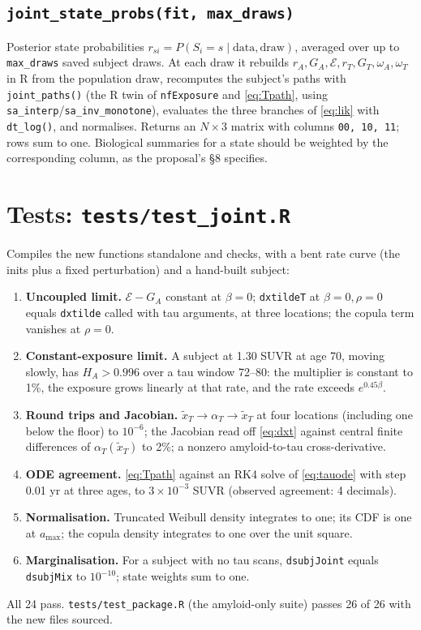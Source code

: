 \documentclass[11pt]{article}
\newcommand{\code}[1]{\texttt{#1}}
\newcommand{\E}{\mathcal{E}}
\begin{document}
\subsection{\code{joint\_state\_probs(fit, max\_draws)}}

Posterior state probabilities $r_{si}=P(S_i=s\mid\text{data},\text{draw})$, averaged
over up to \code{max\_draws} saved subject draws. At each draw it rebuilds
$r_A,G_A,\E,r_T,G_T,\omega_A,\omega_T$ in R from the population draw, recomputes
the subject's paths with \code{joint\_paths()} (the R twin of \code{nfExposure} and
\eqref{eq:Tpath}, using \code{sa\_interp}/\code{sa\_inv\_monotone}), evaluates the three
branches of \eqref{eq:lik} with \code{dt\_log()}, and normalises. Returns an
$N\times3$ matrix with columns \code{00, 10, 11}; rows sum to one. Biological
summaries for a state should be weighted by the corresponding column, as the
proposal's \S8 specifies.

\section{Tests: \code{tests/test\_joint.R}}\label{sec:tests}

Compiles the new functions standalone and checks, with a bent rate curve
(the inits plus a fixed perturbation) and a hand-built subject:
\begin{enumerate}[nosep]
\item \textbf{Uncoupled limit.} $\E-G_A$ constant at $\beta=0$; \code{dxtildeT} at
$\beta=0,\rho=0$ equals \code{dxtilde} called with tau arguments, at three
locations; the copula term vanishes at $\rho=0$.
\item \textbf{Constant-exposure limit.} A subject at 1.30 SUVR at age 70, moving
slowly, has $H_A>0.996$ over a tau window 72--80: the multiplier is constant to
1\%, the exposure grows linearly at that rate, and the rate exceeds $e^{0.45\beta}$.
\item \textbf{Round trips and Jacobian.} $\tilde x_T\to\alpha_T\to\tilde x_T$ at four
locations (including one below the floor) to $10^{-6}$; the Jacobian read off
\eqref{eq:dxt} against central finite differences of $\alpha_T(\tilde x_T)$ to 2\%;
a nonzero amyloid-to-tau cross-derivative.
\item \textbf{ODE agreement.} \eqref{eq:Tpath} against an RK4 solve of
\eqref{eq:tauode} with step 0.01 yr at three ages, to $3\times10^{-3}$ SUVR
(observed agreement: 4 decimals).
\item \textbf{Normalisation.} Truncated Weibull density integrates to one; its CDF is
one at $a_{\max}$; the copula density integrates to one over the unit square.
\item \textbf{Marginalisation.} For a subject with no tau scans, \code{dsubjJoint}
equals \code{dsubjMix} to $10^{-10}$; state weights sum to one.
\end{enumerate}
All 24 pass. \code{tests/test\_package.R} (the amyloid-only suite) passes 26 of 26
with the new files sourced.
\end{document}
